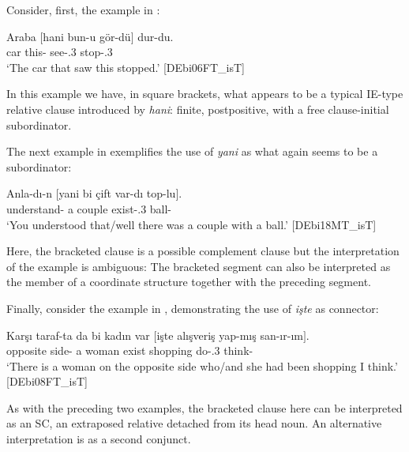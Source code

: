 \documentclass[output=paper,colorlinks,citecolor=brown]{langscibook}
\begin{document}

Consider, first, the example in :

\ea \label{ex:keskin:IE_hani}
\gll Araba $[$hani bun-u gör-dü$]$ dur-du.\\
car \hphantom{[}\Conn{} this-\Acc{} see-\Pst.3\Sg{} stop-\Pst.3\Sg\\
\glt ‘The car that saw this stopped.’ [DEbi06FT\_isT]
\z

\noindent
In this example we have, in square brackets, what appears to be a typical IE-type relative clause introduced by \textit{hani}: finite, postpositive, with a free clause-initial subordinator.

The next example in  exemplifies the use of \textit{yani} as what again seems to be a subordinator:

\ea \label{ex:keskin:IE_yani}
\gll Anla-dı-n $[$yani bi çift var-dı top-lu$]$.\\
understand-\Sg{} \hphantom{[}\Conn{} a couple exist-\Pst.3\Sg{} ball-\Attr{}\\
\glt ‘You understood {that/well} there was a couple with a ball.’ [DEbi18MT\_isT]
\z

\noindent
Here, the bracketed clause is a possible complement clause but the interpretation of the example is ambiguous: The bracketed segment can also be interpreted as the member of a coordinate structure together with the preceding segment.

Finally, consider the example in , demonstrating the use of \textit{işte} as connector:

\ea \label{ex:keskin:IE_iste}
\gll Karşı taraf-ta da bi kadın	var	$[$işte	alışveriş	yap-mış	san-ır-ım$]$.\\
opposite	side-\Loc{}	\Foc{}	a	woman	exist	\hphantom{[}\Conn{}	shopping	do-\Prf.3\Sg{}	think-\Aor-1\Sg{}\\
\glt ‘There is a woman on the opposite side {who/and she} had been shopping I think.’ [DEbi08FT\_isT]
\z

\noindent
As with the preceding two examples, the bracketed clause here can be interpreted as an SC, an extraposed relative detached from its head noun. An alternative interpretation is as a second conjunct.

\end{document}
